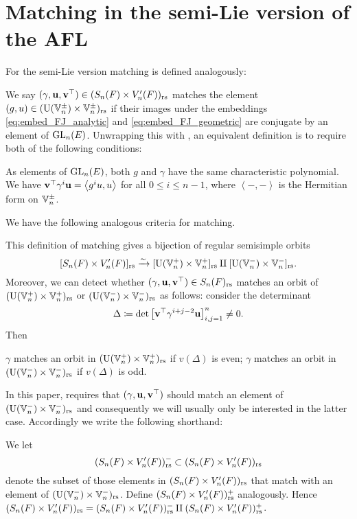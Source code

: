 \section{Matching in the semi-Lie version of the AFL}
For the semi-Lie version matching is defined analogously:
\begin{definition}
  We say $(\gamma, \mathbf u, \mathbf v^\top) \in (S_n(F) \times V'_n(F))_{\mathrm{rs}}$
  matches the element $(g, u) \in (\operatorname{U}(\mathbb V_n^\pm) \times \mathbb V_n^\pm)_{\mathrm{rs}}$ if
  their images under the embeddings \eqref{eq:embed_FJ_analytic}
  and \eqref{eq:embed_FJ_geometric} are conjugate by an element of $\operatorname{GL}_n(E)$.
  Unwrapping this with ,
  an equivalent definition is to require both of the following conditions:
  \begin{itemize}
    \ii As elements of $\operatorname{GL}_n(E)$,
    both $g$ and $\gamma$ have the same characteristic polynomial.
    \ii We have $\mathbf v^\top \gamma^i \mathbf u = \left< g^i u, u \right>$ for all $0 \le i \le n-1$,
    where $\left< -,- \right>$ is the Hermitian form on $\mathbb V_n^\pm$.
  \end{itemize}
  \label{def:matching_semi_lie}
\end{definition}
We have the following analogous criteria for matching.
\begin{proposition}
  \label{prop:valuation_delta_matching_semilie}
  This definition of matching gives a bijection of regular semisimple orbits
  \[ [S_n(F) \times V'_n(F)]_{\mathrm{rs}} \xrightarrow{\sim} [\operatorname{U}(\mathbb V_n^+) \times \mathbb V_n^+]_{\mathrm{rs}} \amalg [\operatorname{U}(\mathbb V_n^-) \times \mathbb V_n^-]_{\mathrm{rs}}. \]
  Moreover, we can detect whether ${(\gamma, \mathbf u, \mathbf v^\top)} \in S_n(F)_{\mathrm{rs}}$ matches an orbit of
  $(\operatorname{U}(\mathbb V_n^+) \times \mathbb V_n^+)_{\mathrm{rs}}$ or $(\operatorname{U}(\mathbb V_n^-) \times \mathbb V_n^-)_{\mathrm{rs}}$ as follows:
  consider the determinant
  \[ \Delta \coloneqq \det \left[ \mathbf v^\top \gamma^{i+j-2} \mathbf u \right]_{i,j=1}^n \neq 0. \]
  Then
  \begin{itemize}
    \ii $\gamma$ matches an orbit in $(\operatorname{U}(\mathbb V_n^+) \times \mathbb V_n^+)_{\mathrm{rs}}$ if $v(\Delta)$ is even;
    \ii $\gamma$ matches an orbit in $(\operatorname{U}(\mathbb V_n^-) \times \mathbb V_n^-)_{\mathrm{rs}}$ if $v(\Delta)$ is odd.
  \end{itemize}
\end{proposition}
In this paper, 
requires that ${(\gamma, \mathbf u, \mathbf v^\top)}$ should match an element of $(\operatorname{U}(\mathbb V_n^-) \times \mathbb V_n^-)_{\mathrm{rs}}$
and consequently we will usually only be interested in the latter case.
Accordingly we write the following shorthand:
\begin{definition}
  [$(S_n(F) \times V'_n(F))\rs^\pm$]
  We let \[ (S_n(F) \times V'_n(F))_{\mathrm{rs}}^- \subset (S_n(F) \times V'_n(F))_{\mathrm{rs}}  \]
  denote the subset of those elements in $(S_n(F) \times V'_n(F))_{\mathrm{rs}}$ that match
  with an element of $(\operatorname{U}(\mathbb V_n^-) \times \mathbb V_n^-)_{\mathrm{rs}}$.
  Define $(S_n(F) \times V'_n(F))_{\mathrm{rs}}^+$ analogously.
  Hence $(S_n(F) \times V'_n(F))_{\mathrm{rs}} = (S_n(F) \times V'_n(F))_{\mathrm{rs}}^- \amalg (S_n(F) \times V'_n(F))_{\mathrm{rs}}^+$.
\end{definition}
